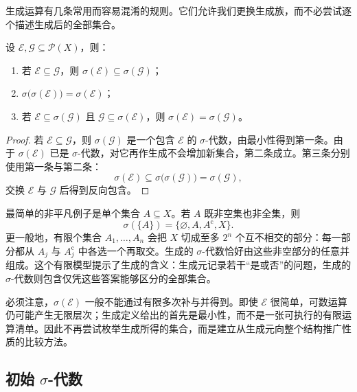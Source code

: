 生成运算有几条常用而容易混淆的规则。它们允许我们更换生成族，而不必尝试逐个描述生成后的全部集合。

\begin{proposition}
\label{b1:prop:generated-rules}
设 \(\mathcal E,\mathcal G\subseteq\mathcal P(X)\)，则：
\begin{enumerate}
  \item \label{b1:item:generated-rules-1}
  若 \(\mathcal E\subseteq\mathcal G\)，则 \(\sigma(\mathcal E)\subseteq\sigma(\mathcal G)\)；
  \item \label{b1:item:generated-rules-2}
  \(\sigma\bigl(\sigma(\mathcal E)\bigr)=\sigma(\mathcal E)\)；
  \item \label{b1:item:generated-rules-3}
  若 \(\mathcal E\subseteq\sigma(\mathcal G)\) 且 \(\mathcal G\subseteq\sigma(\mathcal E)\)，则 \(\sigma(\mathcal E)=\sigma(\mathcal G)\)。
\end{enumerate}
\end{proposition}
\begin{proof}
若 \(\mathcal E\subseteq\mathcal G\)，则 \(\sigma(\mathcal G)\) 是一个包含 \(\mathcal E\) 的 \(\sigma\)-代数，由最小性得到第一条。由于 \(\sigma(\mathcal E)\) 已是 \(\sigma\)-代数，对它再作生成不会增加新集合，第二条成立。第三条分别使用第一条与第二条：
\[
\sigma(\mathcal E)
\subseteq\sigma\bigl(\sigma(\mathcal G)\bigr)
=\sigma(\mathcal G),
\]
交换 \(\mathcal E\) 与 \(\mathcal G\) 后得到反向包含。
\end{proof}

最简单的非平凡例子是单个集合 \(A\subseteq X\)。若 \(A\) 既非空集也非全集，则
\[
\sigma(\{A\})=\{\varnothing,A,A^{\mathrm c},X\}.
\]
更一般地，有限个集合 \(A_1,\ldots,A_n\) 会把 \(X\) 切成至多 \(2^n\) 个互不相交的部分：每一部分都从 \(A_j\) 与 \(A_j^{\mathrm c}\) 中各选一个再取交。生成的 \(\sigma\)-代数恰好由这些非空部分的任意并组成。这个有限模型提示了生成的含义：生成元记录若干“是或否”的问题，生成的 \(\sigma\)-代数则包含仅凭这些答案能够区分的全部集合。

\ProseParagraphBreak

必须注意，\(\sigma(\mathcal E)\) 一般不能通过有限多次补与并得到。即使 \(\mathcal E\) 很简单，可数运算仍可能产生无限层次；生成定义给出的首先是最小性，而不是一张可执行的有限运算清单。因此不再尝试枚举生成所得的集合，而是建立从生成元向整个结构推广性质的比较方法。

\subsection{初始 \texorpdfstring{\(\sigma\)}{\AnalysisPdfSigma}-代数}
\label{b1:subsec:010202}

